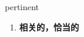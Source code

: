 
\begin{frame}
{\huge pertinent}
\begin{center}
\begin{enumerate}\Large
  \item \textbf{相关的，恰当的}
\end{enumerate}
\end{center}
\end{frame}
